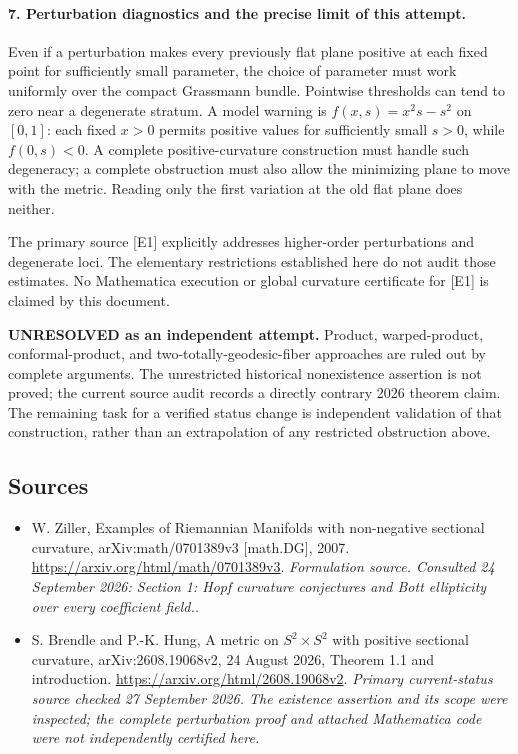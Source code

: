 \documentclass[11pt]{article}
\begin{document}
\paragraph{7. Perturbation diagnostics and the precise limit of this attempt.}
Even if a perturbation makes every previously flat plane positive at each fixed point for sufficiently small parameter, the choice of parameter must work uniformly over the compact Grassmann bundle. Pointwise thresholds can tend to zero near a degenerate stratum. A model warning is $f(x,s)=x^2s-s^2$ on $[0,1]$: each fixed $x>0$ permits positive values for sufficiently small $s>0$, while $f(0,s)<0$. A complete positive-curvature construction must handle such degeneracy; a complete obstruction must also allow the minimizing plane to move with the metric. Reading only the first variation at the old flat plane does neither.

The primary source [E1] explicitly addresses higher-order perturbations and degenerate loci. The elementary restrictions established here do not audit those estimates. No Mathematica execution or global curvature certificate for [E1] is claimed by this document.

\textbf{UNRESOLVED as an independent attempt.} Product, warped-product, conformal-product, and two-totally-geodesic-fiber approaches are ruled out by complete arguments. The unrestricted historical nonexistence assertion is not proved; the current source audit records a directly contrary 2026 theorem claim. The remaining task for a verified status change is independent validation of that construction, rather than an extrapolation of any restricted obstruction above.

\subsection{Sources}
\begin{itemize}
\item[S1]W. Ziller, Examples of Riemannian Manifolds with non-negative sectional curvature, arXiv:math/0701389v3 [math.DG], 2007.
\url{https://arxiv.org/html/math/0701389v3}.
\textit{Formulation source. Consulted 24 September 2026: Section 1: Hopf curvature conjectures and Bott ellipticity over every coefficient field..}
\item[E1]S. Brendle and P.-K. Hung, A metric on $S^2\times S^2$ with positive sectional curvature, arXiv:2608.19068v2, 24 August 2026, Theorem 1.1 and introduction.
\url{https://arxiv.org/html/2608.19068v2}.
\textit{Primary current-status source checked 27 September 2026. The existence assertion and its scope were inspected; the complete perturbation proof and attached Mathematica code were not independently certified here.}
\end{itemize}
\end{document}
